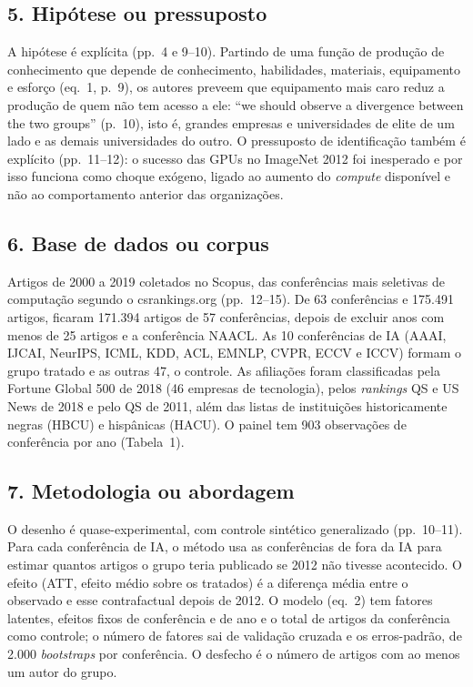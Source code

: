 \subsection*{5. Hipótese ou pressuposto}
A hipótese é explícita (pp.~4 e 9--10). Partindo de uma função de produção de conhecimento que
depende de conhecimento, habilidades, materiais, equipamento e esforço (eq.~1, p.~9), os autores
preveem que equipamento mais caro reduz a produção de quem não tem acesso a ele: ``we should
observe a divergence between the two groups'' (p.~10), isto é, grandes empresas e universidades de
elite de um lado e as demais universidades do outro. O pressuposto de identificação também é
explícito (pp.~11--12): o sucesso das GPUs no ImageNet 2012 foi inesperado e por isso funciona como
choque exógeno, ligado ao aumento do \emph{compute} disponível e não ao comportamento anterior das
organizações.

\subsection*{6. Base de dados ou corpus}
Artigos de 2000 a 2019 coletados no Scopus, das conferências mais seletivas de computação segundo
o csrankings.org (pp.~12--15). De 63 conferências e 175.491 artigos, ficaram 171.394 artigos de 57
conferências, depois de excluir anos com menos de 25 artigos e a conferência NAACL. As 10
conferências de IA (AAAI, IJCAI, NeurIPS, ICML, KDD, ACL, EMNLP, CVPR, ECCV e ICCV) formam o grupo
tratado e as outras 47, o controle. As afiliações foram classificadas pela Fortune Global 500 de
2018 (46 empresas de tecnologia), pelos \emph{rankings} QS e US News de 2018 e pelo QS de 2011, além
das listas de instituições historicamente negras (HBCU) e hispânicas (HACU). O painel tem 903
observações de conferência por ano (Tabela~1).

\subsection*{7. Metodologia ou abordagem}
O desenho é quase-experimental, com controle sintético generalizado (pp.~10--11). Para cada
conferência de IA, o método usa as conferências de fora da IA para estimar quantos artigos o grupo
teria publicado se 2012 não tivesse acontecido. O efeito (ATT, efeito médio sobre os tratados) é a
diferença média entre o observado e esse contrafactual depois de 2012. O modelo (eq.~2) tem fatores
latentes, efeitos fixos de conferência e de ano e o total de artigos da conferência como controle;
o número de fatores sai de validação cruzada e os erros-padrão, de 2.000 \emph{bootstraps} por
conferência. O desfecho é o número de artigos com ao menos um autor do grupo.

